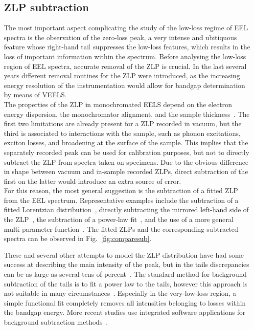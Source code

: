 \subsection{ZLP subtraction}
\label{sec:zlpsubtraction}

The most important aspect complicating the study of the low-loss regime of EEL spectra 
is the observation of the zero-loss peak, a very intense and ubitiquous feature 
whose right-hand tail suppresses the low-loss features, which results in the loss
of important information within the spectrum.
%
Before analysing the low-loss region of EEL spectra, accurate removal of the
ZLP is crucial. 
%
In the last several years different removal routines for the ZLP were introduced, 
as the increasing energy resolution of the instrumentation would allow for bandgap 
determination by means of VEELS.\\

The properties of the ZLP in monochromated EELS depend on the electron energy dispersion,
the monochromator alignment, and the sample thickness~\cite{Park:2008, Stoger:2008}.
%
The first two limitations are already present for a ZLP recorded in vacuum,
but the third is associated to interactions with the sample, such as phonon excitations, 
exciton losses, and broadening at the surface of the sample.
%
This implies that the separately recorded peak can be used for calibration purposes,
but not to directly subtract the ZLP from spectra taken on specimens. 
%
Due to the obvious difference in shape between vacuum and in-sample recorded ZLPs, 
direct subtraction of the first on the latter would introduce an extra
source of error. \\

For this reason, the most general suggestion is the subtraction of a fitted ZLP 
from the EEL spectrum.
%
Representative examples include the subtraction of a fitted Lorentzian distribution~\cite{Dorneich:1998},
directly subtracting the mirrored left-hand side of the ZLP~\cite{Lazar:2003},
the subtraction of a power-law fit~\cite{Erni:2005}, and the use of a
more general multi-parameter function~\cite{Benthem:2001}.
%
The fitted ZLPs and the corresponding subtracted spectra can be observed in Fig.~\ref{fig:comparesub}.

These and several other attempts to model the ZLP distribution 
have had some success at describing the main intensity of the peak, 
but in the tails discrepancies can be as large as several tens of percent~\cite{Bangert:2003}.
%
The standard method for background subtraction of the tails
is to fit a power law to the tails, however this approach is not suitable in
many circumstances~\cite{Hachtel:2018, Tenailleau:1992, Reed:2002, Bosman:2006}.
%
Especially in the very-low-loss region, a simple functional fit completely
removes all intensities belonging to losses within the bandgap energy.
%
More recent studies use integrated software applications for background subtraction 
methods~\cite{Egerton:10.1016/S0304-3991(01)00155-3, Held:2020, Granerod:2018, Fung:2020}.\\

